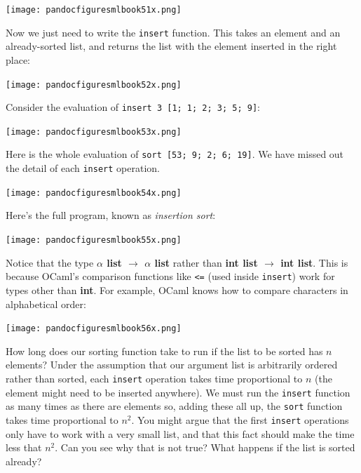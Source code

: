 \documentclass[]{book}
\begin{document}
\medskip
\begin{center}
\noindent\texttt{[image: pandocfiguresmlbook51x.png]}
\end{center}
\medskip

\noindent Now we just need to write the \texttt{insert} function. This takes an element and an already-sorted list, and returns the list with the element inserted in the right place:

\medskip
\begin{center}
\noindent\texttt{[image: pandocfiguresmlbook52x.png]}
\end{center}
\medskip

\noindent Consider the evaluation of \texttt{insert 3 [1; 1; 2; 3; 5; 9]}:

\medskip
\begin{center}
\noindent\texttt{[image: pandocfiguresmlbook53x.png]}
\end{center}
\medskip

\noindent Here is the whole evaluation of \texttt{sort [53; 9; 2; 6; 19]}. We have missed out the detail of each \texttt{insert} operation.

\medskip
\begin{center}
\noindent\texttt{[image: pandocfiguresmlbook54x.png]}
\end{center}
\medskip

\noindent Here's the full program, known as \textit{insertion sort}:

\medskip
\begin{center}
\noindent\texttt{[image: pandocfiguresmlbook55x.png]}
\end{center}
\medskip

\noindent Notice that the type \textbf{\textsf{$\alpha$ list $\rightarrow$ $\alpha$ list}} rather than \textbf{\textsf{int list $\rightarrow$ int list}}. This is because OCaml's comparison functions like \texttt{<=} (used inside \texttt{insert}) work for types other than \textbf{\textsf{int}}.  For example, OCaml knows how to compare characters in alphabetical order:

\medskip
\begin{center}
\noindent\texttt{[image: pandocfiguresmlbook56x.png]}
\end{center}
\medskip

\noindent How long does our sorting function take to run if the list to be sorted has $n$ elements? Under the assumption that our argument list is arbitrarily ordered rather than sorted, each \texttt{insert} operation takes time proportional to $n$ (the element might need to be inserted anywhere). We must run the \texttt{insert} function as many times as there are elements so, adding these all up, the \texttt{sort} function takes time proportional to $n^2$. You might argue that the first \texttt{insert} operations only have to work with a very small list, and that this fact should make the time less that $n^2$. Can you see why that is not true? What happens if the list is sorted already?
\end{document}
